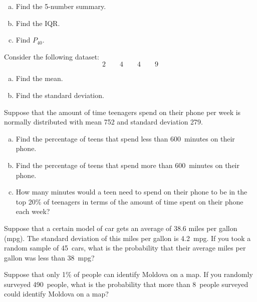 \documentclass[12pt,letterpaper]{exam}
\begin{document}
\begin{questions}
\begin{enumerate}[(a)]
\item Find the 5-number summary. 
\item Find the IQR. 
\item Find $P_{40}$. 
\end{enumerate}



\newpage
\question[10] Consider the following dataset:
	\[
	2 \qquad 4 \qquad 4 \qquad 9
	\]
	
\begin{enumerate}[(a)]
\item Find the mean. 
\item Find the standard deviation. 
\end{enumerate}



\newpage
\question[10] Suppose that the amount of time teenagers spend on their phone per week is normally distributed with mean 752 and standard deviation 279.
	\begin{enumerate}[(a)]
	\item Find the percentage of teens that spend less than 600~minutes on their phone.
	\item Find the percentage of teens that spend more than 600~minutes on their phone. 
	\item How many minutes would a teen need to spend on their phone to be in the top 20\% of teenagers in terms of the amount of time spent on their phone each week?
	\end{enumerate}



\newpage
\question[10] Suppose that a certain model of car gets an average of 38.6 miles per gallon (mpg). The standard deviation of this miles per gallon is 4.2~mpg. If you took a random sample of 45~cars, what is the probability that their average miles per gallon was less than 38~mpg? 



\newpage
\question[10] Suppose that only 1\% of people can identify Moldova on a map. If you randomly surveyed 490~people, what is the probability that more than 8~people surveyed could identify Moldova on a map? 


\end{questions}
\end{document}
